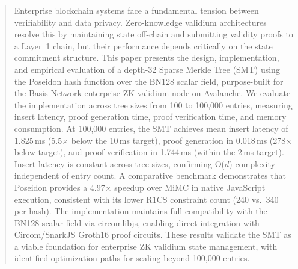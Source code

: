 
\begin{abstract}
Enterprise blockchain systems face a fundamental tension between verifiability and data privacy. Zero-knowledge validium architectures resolve this by maintaining state off-chain and submitting validity proofs to a Layer~1 chain, but their performance depends critically on the state commitment structure. This paper presents the design, implementation, and empirical evaluation of a depth-32 Sparse Merkle Tree (SMT) using the Poseidon hash function over the BN128 scalar field, purpose-built for the Basis Network enterprise ZK validium node on Avalanche. We evaluate the implementation across tree sizes from 100 to 100{,}000 entries, measuring insert latency, proof generation time, proof verification time, and memory consumption. At 100{,}000 entries, the SMT achieves mean insert latency of 1.825\,ms (5.5$\times$ below the 10\,ms target), proof generation in 0.018\,ms (278$\times$ below target), and proof verification in 1.744\,ms (within the 2\,ms target). Insert latency is constant across tree sizes, confirming O($d$) complexity independent of entry count. A comparative benchmark demonstrates that Poseidon provides a 4.97$\times$ speedup over MiMC in native JavaScript execution, consistent with its lower R1CS constraint count (240 vs.\ 340 per hash). The implementation maintains full compatibility with the BN128 scalar field via circomlibjs, enabling direct integration with Circom/SnarkJS Groth16 proof circuits. These results validate the SMT as a viable foundation for enterprise ZK validium state management, with identified optimization paths for scaling beyond 100{,}000 entries.
\end{abstract}
